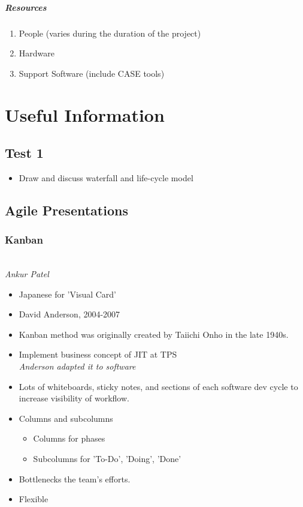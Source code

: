 \documentclass{report}
\begin{document}
				\subsubsection{Resources}
					\begin{enumerate}
						\item People (varies during the duration of the project)
						\item Hardware
						\item Support Software (include CASE tools)
					\end{enumerate}
\part{Useful Information}
	\chapter{Test 1}
		\begin{itemize}
			\item Draw and discuss waterfall and life-cycle model
		\end{itemize}
	\chapter{Agile Presentations}
		\section{Kanban}\\
			\textit{Ankur Patel}
			\begin{itemize}
				\item Japanese for 'Visual Card'
				\item David Anderson, 2004-2007
				\item Kanban method was originally created by Taiichi Onho in the late 1940s.
				\item Implement business concept of JIT at TPS\\
					\textit{Anderson adapted it to software}
				\item Lots of whiteboards, sticky notes, and sections of each software dev cycle to increase visibility of workflow.
				\item Columns and subcolumns
					\begin{itemize}
						\item Columns for phases
						\item Subcolumns for 'To-Do', 'Doing', 'Done'
					\end{itemize}
				\item Bottlenecks the team's efforts.
				\item Flexible
			\end{itemize}
\end{document}
